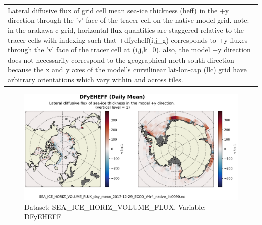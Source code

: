 \begin{longtable}{|m{}|m{}|m{}|m{}|}
\rowcolor{lightgray} \multicolumn{4}{|c|}{\textbf{Comments}} \\ \hline
\multicolumn{4}{|p{1\textwidth}|}{\footnotesize{{Lateral diffusive flux of grid cell mean sea-ice thickness (heff) in the +y direction through the 'v' face of the tracer cell on the native model grid. note: in the arakawa-c grid, horizontal flux quantities are staggered relative to the tracer cells with indexing such that +dfyeheff(i,j\_g) corresponds to +y fluxes through the 'v' face of the tracer cell at (i,j,k=0). also, the model +y direction does not necessarily correspond to the geographical north-south direction because the x and y axes of the model's curvilinear lat-lon-cap (llc) grid have arbitrary orientations which vary within and across tiles.}}} \\ \hline
\end{longtable}

\begin{figure}[H]
\centering
\includegraphics[scale=0.55]{../images/plots/native_plots/Sea-Ice_and_Snow_Horizontal_Volume_Fluxes/DFyEHEFF.png}
\caption{Dataset: SEA\_ICE\_HORIZ\_VOLUME\_FLUX, Variable: DFyEHEFF}
\label{tab:table-SEA_ICE_HORIZ_VOLUME_FLUX_DFyEHEFF-Plot}
\end{figure}
\newpage
\pagebreak
